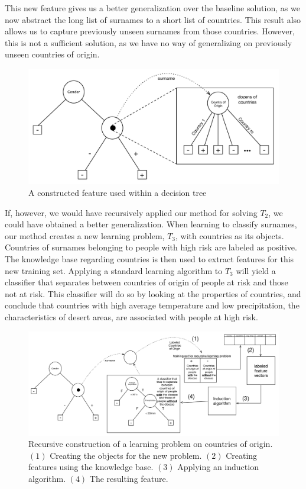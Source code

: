 \documentclass{article}
\theoremstyle{definition}
\begin{document}
This new feature gives us a better generalization over the baseline solution, as we now abstract the long list of surnames to a short list of countries. %
This result also allows us to capture previously unseen surnames from those countries. However, this is not a sufficient solution, as we have no way of generalizing on previously unseen countries of origin. %


\begin{figure}[h]
	\centering
	\includegraphics[width=0.7\linewidth]{fig2.pdf}
	\caption{A constructed feature used within a decision tree}
	\label{fig:lvl1_tree}
\end{figure}

If, however, we would have recursively applied our method for solving $T_2$, we could have obtained a better generalization.
When learning to classify surnames, our method creates a new learning problem, $T_3$, with countries as its objects. Countries of surnames belonging to people with high risk are labeled as positive. The knowledge base regarding countries is then used to extract features for this new training set.
Applying a standard learning algorithm to $T_3$ will yield a classifier that separates between countries of origin of people at risk and those not at risk. This classifier will do so by looking at the properties of countries, and conclude that countries with high average temperature and low precipitation, the characteristics of desert areas, are associated with people at high risk.

\begin{figure}[th]
	\centering
	\includegraphics[width=0.9\linewidth,height=0.33\linewidth]{fig4_annotated.pdf}
	\caption{Recursive construction of a learning problem on countries of origin. $(1)$ Creating the objects for the new problem. $(2)$ Creating features using the knowledge base. $(3)$ Applying an induction algorithm. $(4)$ The resulting feature.}
	\label{fig:moving_to_lvl2}
\end{figure}
\end{document}
